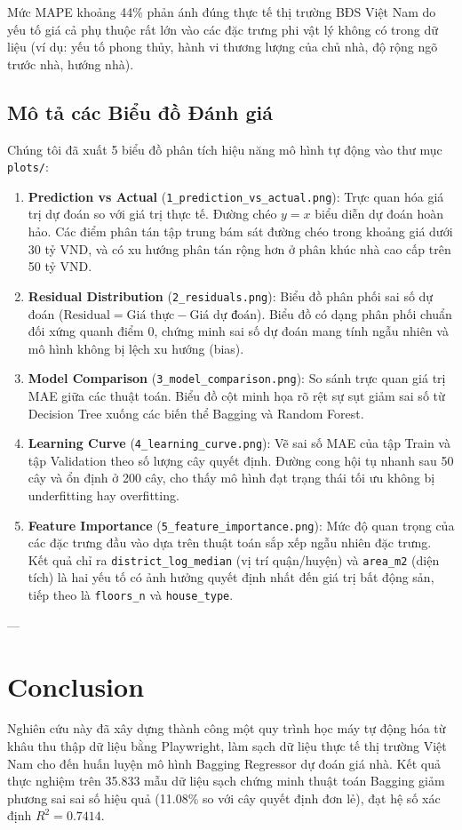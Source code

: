 \documentclass[sigconf]{acmart}
\begin{document}
Mức MAPE khoảng 44\% phản ánh đúng thực tế thị trường BĐS Việt Nam do yếu tố giá cả phụ thuộc rất lớn vào các đặc trưng phi vật lý không có trong dữ liệu (ví dụ: yếu tố phong thủy, hành vi thương lượng của chủ nhà, độ rộng ngõ trước nhà, hướng nhà).

\subsection{Mô tả các Biểu đồ Đánh giá}
Chúng tôi đã xuất 5 biểu đồ phân tích hiệu năng mô hình tự động vào thư mục \texttt{plots/}:
\begin{enumerate}
    \item \textbf{Prediction vs Actual} (\texttt{1\_prediction\_vs\_actual.png}): Trực quan hóa giá trị dự đoán so với giá trị thực tế. Đường chéo $y=x$ biểu diễn dự đoán hoàn hảo. Các điểm phân tán tập trung bám sát đường chéo trong khoảng giá dưới 30 tỷ VND, và có xu hướng phân tán rộng hơn ở phân khúc nhà cao cấp trên 50 tỷ VND.
    \item \textbf{Residual Distribution} (\texttt{2\_residuals.png}): Biểu đồ phân phối sai số dự đoán ($\text{Residual} = \text{Giá thực} - \text{Giá dự đoán}$). Biểu đồ có dạng phân phối chuẩn đối xứng quanh điểm 0, chứng minh sai số dự đoán mang tính ngẫu nhiên và mô hình không bị lệch xu hướng (bias).
    \item \textbf{Model Comparison} (\texttt{3\_model\_comparison.png}): So sánh trực quan giá trị MAE giữa các thuật toán. Biểu đồ cột minh họa rõ rệt sự sụt giảm sai số từ Decision Tree xuống các biến thể Bagging và Random Forest.
    \item \textbf{Learning Curve} (\texttt{4\_learning\_curve.png}): Vẽ sai số MAE của tập Train và tập Validation theo số lượng cây quyết định. Đường cong hội tụ nhanh sau 50 cây và ổn định ở 200 cây, cho thấy mô hình đạt trạng thái tối ưu không bị underfitting hay overfitting.
    \item \textbf{Feature Importance} (\texttt{5\_feature\_importance.png}): Mức độ quan trọng của các đặc trưng đầu vào dựa trên thuật toán sắp xếp ngẫu nhiên đặc trưng. Kết quả chỉ ra \texttt{district\_log\_median} (vị trí quận/huyện) và \texttt{area\_m2} (diện tích) là hai yếu tố có ảnh hưởng quyết định nhất đến giá trị bất động sản, tiếp theo là \texttt{floors\_n} và \texttt{house\_type}.
\end{enumerate}

---

\section{Conclusion}
Nghiên cứu này đã xây dựng thành công một quy trình học máy tự động hóa từ khâu thu thập dữ liệu bằng Playwright, làm sạch dữ liệu thực tế thị trường Việt Nam cho đến huấn luyện mô hình Bagging Regressor dự đoán giá nhà. Kết quả thực nghiệm trên 35.833 mẫu dữ liệu sạch chứng minh thuật toán Bagging giảm phương sai sai số hiệu quả (11.08\% so với cây quyết định đơn lẻ), đạt hệ số xác định $R^2 = 0.7414$.
\end{document}
